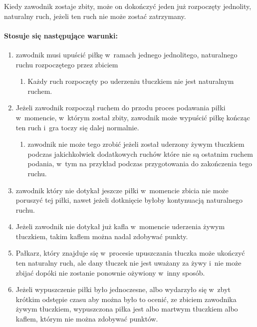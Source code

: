 \documentclass[12pt]{article}
\begin{document}
Kiedy zawodnik zostaje zbity, może on dokończyć jeden już rozpoczęty
jednolity, naturalny ruch, jeżeli ten ruch nie może zostać zatrzymany.

\paragraph{Stosuje się następujące warunki:}

\begin{enumerate}
	\item
	      zawodnik musi upuścić piłkę w~ramach jednego jednolitego, naturalnego
	      ruchu rozpoczętego przez zbiciem

	      \begin{enumerate}
		      \item
		            Każdy ruch rozpoczęty po uderzeniu tłuczkiem nie jest naturalnym
		            ruchem.
	      \end{enumerate}
	\item
	      Jeżeli zawodnik rozpoczął ruchem do przodu proces podawania piłki w~momencie, w~którym został zbity, zawodnik może wypuścić piłkę kończąc
	      ten ruch i~gra toczy się dalej normalnie.

	      \begin{enumerate}
		      \item
		            zawodnik nie może tego zrobić jeżeli został uderzony żywym tłuczkiem
		            podczas jakichkolwiek dodatkowych ruchów które nie są ostatnim
		            ruchem podania, w~tym na przykład podczas przygotowania do
		            zakończenia tego ruchu.
	      \end{enumerate}
	\item
	      zawodnik który nie dotykał jeszcze piłki w~momencie zbicia nie może
	      poruszyć tej piłki, nawet jeżeli dotknięcie byłoby kontynuacją
	      naturalnego ruchu.
	\item
	      Jeżeli zawodnik nie dotykał już kafla w~momencie uderzenia żywym
	      tłuczkiem, takim kaflem można nadal zdobywać punkty.
	\item
	      Pałkarz, który znajduje się w~procesie upuszczania tłuczka może
	      ukończyć ten naturalny ruch, ale dany tłuczek nie jest uważany za żywy
	      i~nie może zbijać dopóki nie zostanie ponownie ożywiony w~inny sposób.
	\item
	      Jeżeli wypuszczenie piłki było jednoczesne, albo wydarzyło się w~zbyt
	      krótkim odstępie czasu aby można było to ocenić, ze zbiciem zawodnika
	      żywym tłuczkiem, wypuszczona piłka jest albo martwym tłuczkiem albo
	      kaflem, którym nie można zdobywać punktów.
\end{enumerate}
\end{document}
